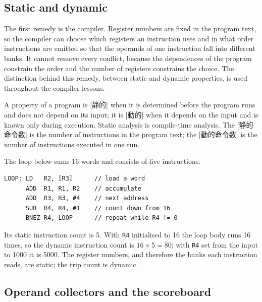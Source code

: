 \documentclass[../main.tex]{subfiles}
\begin{document}
\subsection{Static and dynamic}

The first remedy is the compiler.  Register numbers are fixed in the
program text, so the compiler can choose which registers an instruction
uses and in what order instructions are emitted so that the operands of
one instruction fall into different banks.  It cannot remove every
conflict, because the dependences of the program constrain the order and
the number of registers constrains the choice.  The distinction behind this remedy, between static and
dynamic properties, is used throughout the compiler lessons.

\begin{definition}
  \label{def:l04-static-dynamic}
  A property of a program is [静的] when it is determined
  before the program runs and does not depend on its input; it is
  [動的] when it depends on the input and is known only
  during execution.  Static analysis is compile-time analysis.  The
  [静的命令数] is the number of
  instructions in the program text; the
  [動的命令数] is the number of
  instructions executed in one run.
\end{definition}

\begin{example}
  \label{ex:l04-static-dynamic}
  The loop below sums 16 words and consists of five instructions.
\begin{lstlisting}[numbers=none]
LOOP: LD   R2, [R3]      // load a word
      ADD  R1, R1, R2    // accumulate
      ADD  R3, R3, #4    // next address
      SUB  R4, R4, #1    // count down from 16
      BNEZ R4, LOOP      // repeat while R4 != 0
\end{lstlisting}
  Its static instruction count is 5.  With \texttt{R4} initialised to 16
  the loop body runs 16 times, so the dynamic instruction count is
  $16 \times 5 = 80$; with \texttt{R4} set from the input to 1000 it is
  \num{5000}.  The register numbers, and therefore the banks each
  instruction reads, are static; the trip count is dynamic.
\end{example}

\subsection{Operand collectors and the scoreboard}
\end{document}
